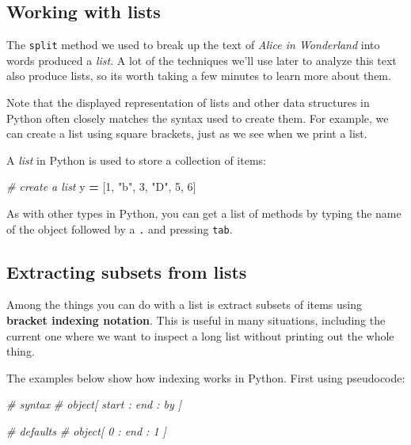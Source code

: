 \documentclass[
]{book}
\newenvironment{Shaded}{\begin{snugshade}}{\end{snugshade}}
\newcommand{\CommentTok}[1]{\textcolor[rgb]{0.56,0.35,0.01}{\textit{#1}}}
\newcommand{\DecValTok}[1]{\textcolor[rgb]{0.00,0.00,0.81}{#1}}
\newcommand{\NormalTok}[1]{#1}
\newcommand{\OperatorTok}[1]{\textcolor[rgb]{0.81,0.36,0.00}{\textbf{#1}}}
\newcommand{\StringTok}[1]{\textcolor[rgb]{0.31,0.60,0.02}{#1}}
\begin{document}
\hypertarget{working-with-lists}{%
\subsection{Working with lists}\label{working-with-lists}}

The \texttt{split} method we used to break up the text of \emph{Alice in Wonderland} into words produced a \emph{list}. A lot of the techniques we'll use later to analyze this text also produce lists, so its worth taking a few minutes to learn more about them.

Note that the displayed representation of lists and other data structures in Python often closely matches the syntax used to create them. For example, we can create a list using square brackets, just as we see when we print a list.

A \emph{list} in Python is used to store a collection of items:

\begin{Shaded}
\begin{Highlighting}[]
\CommentTok{\# create a list}
\NormalTok{y }\OperatorTok{=}\NormalTok{ [}\DecValTok{1}\NormalTok{, }\StringTok{"b"}\NormalTok{, }\DecValTok{3}\NormalTok{, }\StringTok{"D"}\NormalTok{, }\DecValTok{5}\NormalTok{, }\DecValTok{6}\NormalTok{]}
\end{Highlighting}
\end{Shaded}

As with other types in Python, you can get a list of methods by typing the name of the object followed by a \texttt{.} and pressing \texttt{tab}.

\hypertarget{extracting-subsets-from-lists}{%
\subsection{Extracting subsets from lists}\label{extracting-subsets-from-lists}}

Among the things you can do with a list is extract subsets of items using \textbf{bracket indexing notation}. This is useful in many situations, including the current one where we want to inspect a long list without printing out the whole thing.

The examples below show how indexing works in Python. First using pseudocode:

\begin{Shaded}
\begin{Highlighting}[]
\CommentTok{\# syntax}
\CommentTok{\# object[ start : end : by ]}

\CommentTok{\# defaults}
\CommentTok{\# object[ 0 : end : 1 ]}
\end{Highlighting}
\end{Shaded}
\end{document}
